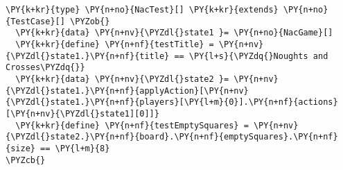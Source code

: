 \begin{Verbatim}[commandchars=\\\{\}]
\PY{k+kr}{type} \PY{n+no}{NacTest}[] \PY{k+kr}{extends} \PY{n+no}{TestCase}[] \PYZob{}
  \PY{k+kr}{data} \PY{n+nv}{\PYZdl{}state1 }= \PY{n+no}{NacGame}[]
  \PY{k+kr}{define} \PY{n+nf}{testTitle} = \PY{n+nv}{\PYZdl{}state1.}\PY{n+nf}{title} == \PY{l+s}{\PYZdq{}Noughts and Crosses\PYZdq{}}
  \PY{k+kr}{data} \PY{n+nv}{\PYZdl{}state2 }= \PY{n+nv}{\PYZdl{}state1.}\PY{n+nf}{applyAction}[\PY{n+nv}{\PYZdl{}state1.}\PY{n+nf}{players}[\PY{l+m}{0}].\PY{n+nf}{actions}[\PY{n+nv}{\PYZdl{}state1][0]]}
  \PY{k+kr}{define} \PY{n+nf}{testEmptySquares} = \PY{n+nv}{\PYZdl{}state2.}\PY{n+nf}{board}.\PY{n+nf}{emptySquares}.\PY{n+nf}{size} == \PY{l+m}{8}
\PYZcb{}
\end{Verbatim}

